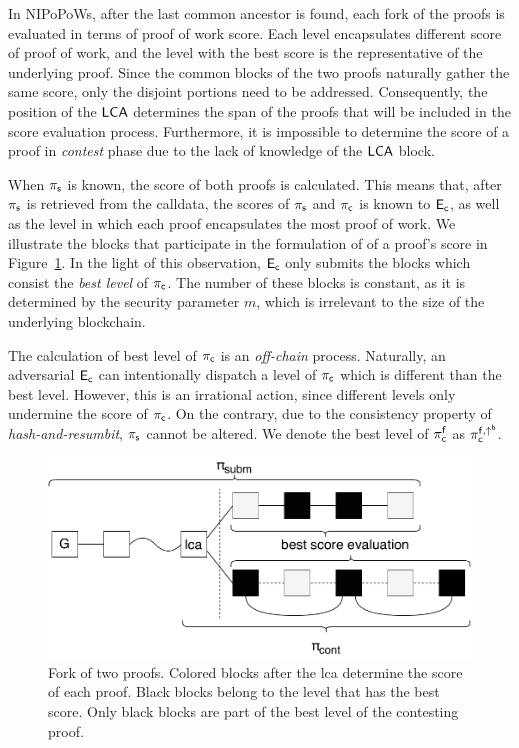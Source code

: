 In NIPoPoWs, after the last common ancestor is found, each fork of the proofs
is evaluated in terms of proof of work score. Each level encapsulates different
score of proof of work, and the level with the best score is the representative
of the underlying proof. Since the common blocks of the two proofs naturally
gather the same score, only the disjoint portions need to be addressed.
Consequently, the position of the $\mathsf{LCA}$ determines the span of the proofs that
will be included in the score evaluation process. Furthermore, it is impossible
to determine the score of a proof in \emph{contest} phase due to the lack of
knowledge of the $\mathsf{LCA}$ block.

When $\mathsf{\pi_{s}}$ is known, the score of both proofs is calculated. This means that,
after $\mathsf{\pi_{s}}$ is retrieved from the calldata, the scores of $\mathsf{\pi_{s}}$ and $\mathsf{\pi_{c}}$ is
known to $\mathsf{E_{c}}$, as well as the level in which each proof encapsulates the most
proof of work. We illustrate the blocks that participate in the formulation of
of a proof's score in Figure~\ref{fig:score-at-levels}. In the light of this
observation, $\mathsf{E_{c}}$ only submits the blocks which consist the \emph{best level}
of $\mathsf{\pi_{c}}$. The number of these blocks is constant, as it is determined by the
security parameter $m$, which is irrelevant to the size of the underlying
blockchain.

The calculation of best level of $\mathsf{\pi_{c}}$ is an \emph{off-chain} process.
Naturally, an adversarial $\mathsf{E_{c}}$ can intentionally dispatch a level of $\mathsf{\pi_{c}}$
which is different than the best level. However, this is an irrational action,
since different levels only undermine the score of $\mathsf{\pi_{c}}$. On the contrary, due
to the consistency property of \emph{hash-and-resumbit}, $\mathsf{\pi_{s}}$ cannot be
altered. We denote the best level of $\mathsf{\pi_{c}^{f}}$ as $\mathsf{\pi_{c}^{f, \uparrow^{b}}}$.

\begin{figure}[H]
    \begin{center}
        \includegraphics[width=1\columnwidth]{figures/blocks-of-best-level.pdf}
    \end{center}
    \caption{Fork of two proofs. Colored blocks after the lca determine the
    score of each proof. Black blocks belong to the level that
    has the best score. Only black blocks are part of the best level of the
    contesting proof.}
    \label{fig:score-at-levels}
\end{figure}

